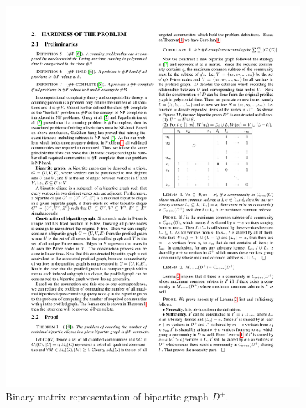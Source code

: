 \begin{figure}[H]
	\centering
	\includegraphics[width=0.88\linewidth]{Figures/ExpandMatrix}
	\caption{Binary matrix representation of bipartite graph $D^+$.}
	\label{fig:newMatrix}
\end{figure} 

